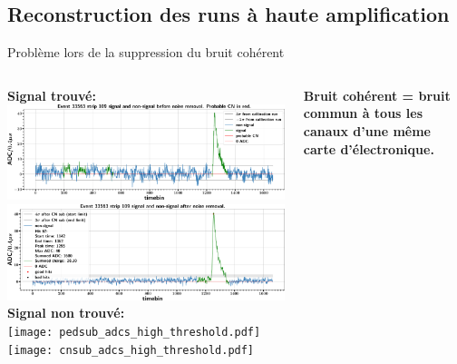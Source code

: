     \subsection{Reconstruction des runs à haute amplification}
    
    \begin{frame}{Problème lors de la suppression du bruit cohérent}
        
        \begin{scriptsize}
            \begin{columns}
                \begin{column}{0.45\textwidth}
                    \centering \textbf{Signal trouvé:}\\
                    \centering \includegraphics[width=\textwidth]{./pictures/good_pedsub.png}\\
                    \centering \includegraphics[width=\textwidth]{./pictures/good_cnsub.png}\\
                    \centering \textbf{Signal non trouvé:}\\
                    \centering \texttt{[image: pedsub\_adcs\_high\_threshold.pdf]}\\
                    \centering \texttt{[image: cnsub\_adcs\_high\_threshold.pdf]}\\
                 \end{column}
                \begin{column}{0.55\textwidth}
                    \textbf{Bruit cohérent = bruit commun à tous les canaux d'une même carte d'électronique.} \\\vspace{0.3cm}

\end{column}
\end{columns}
\end{scriptsize}
\end{frame}
